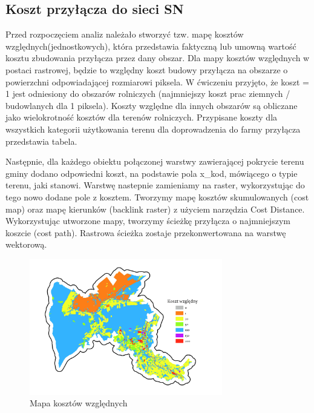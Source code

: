 \documentclass{article}
\begin{document}
\subsection{Koszt przyłącza do sieci SN}
Przed rozpoczęciem analiz należało stworzyć tzw. mapę kosztów względnych(jednostkowych), która przedstawia faktyczną lub umowną wartość kosztu zbudowania
przyłącza przez dany obszar. Dla mapy kosztów względnych w postaci rastrowej, będzie to względny koszt budowy przyłącza na obszarze o powierzchni odpowiadającej rozmiarowi
piksela. W ćwiczeniu przyjęto, że koszt = 1 jest odniesiony do obszarów rolniczych (najmniejszy koszt prac ziemnych / budowlanych dla 1 piksela). Koszty względne dla innych obszarów są obliczane jako wielokrotność kosztów dla terenów rolniczych. Przypisane koszty dla wszystkich kategorii użytkowania terenu dla doprowadzenia do
farmy przyłącza przedstawia tabela.

Następnie, dla każdego obiektu połączonej warstwy zawierającej pokrycie terenu gminy dodano odpowiedni koszt, na podstawie pola x\_kod, mówiącego o typie terenu, jaki stanowi. Warstwę nastepnie zamieniamy na raster, wykorzystując do tego nowo dodane pole z kosztem. Tworzymy mapę kosztów skumulowanych (cost map) oraz mapę kierunków (backlink raster) z użyciem narzędzia Cost Distance. Wykorzystując utworzone mapy, tworzymy ścieżkę przyłącza o najmniejszym koszcie (cost path). Rastrowa ścieżka zostaje przekonwertowana na warstwę wektorową.

\begin{figure}[H]
    \centering
    \includegraphics[width=0.75\textwidth]{img/cost-raster.jpg}
    \caption{Mapa kosztów względnych}
\end{figure}
\end{document}
